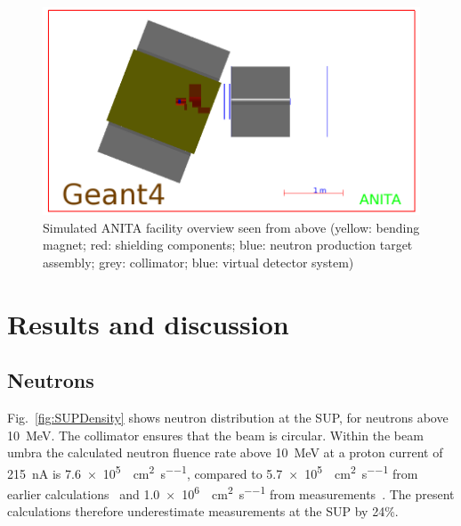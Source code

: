 \documentclass[peerreviewca,11pt,a4paper]{IEEEtran}
\let\MYoriglatexcaption\caption
\renewcommand{\caption}[2][\relax]{\MYoriglatexcaption[#2]{#2}}
\begin{document}
\begin{figure}[t]
	\centering
	\includegraphics[width=\columnwidth]{overview.png}
	\caption{
        Simulated ANITA facility overview seen from above (yellow: bending magnet; red: shielding components; blue: neutron production target assembly; grey: collimator; blue: virtual detector system)
    }
	\label{fig:ANITAoverview}
\end{figure}

\section{Results and discussion}

\subsection{Neutrons}
Fig.~\ref{fig:SUPDensity} shows neutron distribution at the SUP, for neutrons above \SI{10}{\MeV}.
The collimator ensures that the beam is circular. Within the beam umbra the calculated neutron fluence rate above \SI{10}{\MeV} at a proton current of \SI{215}{\nA} is \SI{7.6e5}{\neutron\per\cm\squared\per\second}, compared to \SI{5.7e5}{\neutron\per\cm\squared\per\second} from earlier calculations~\cite{Platt2013} and \SI{1.0e6}{\neutron\per\cm\squared\per\second} from measurements~\cite{Prokofiev2009}.
The present calculations therefore underestimate measurements at the SUP by 24\%.
\end{document}

